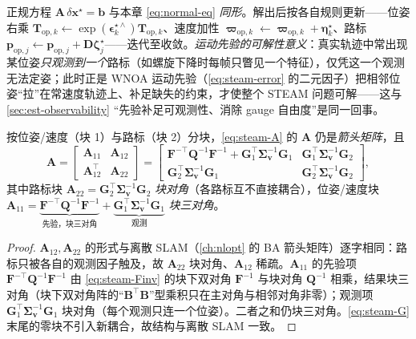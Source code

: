 正规方程 $\mathbf{A}\,\delta\mathbf{x}^\star=\mathbf{b}$ 与本章 \cref{eq:normal-eq} \emph{同形}。解出后按各自规则更新——位姿右乘 $\mathbf{T}_{\mathrm{op},k}\leftarrow\exp(\boldsymbol{\epsilon}_k^{\star\wedge})\mathbf{T}_{\mathrm{op},k}$、速度加性 $\boldsymbol{\varpi}_{\mathrm{op},k}\leftarrow\boldsymbol{\varpi}_{\mathrm{op},k}+\boldsymbol{\eta}_k^\star$、路标 $\mathbf{p}_{\mathrm{op},j}\leftarrow\mathbf{p}_{\mathrm{op},j}+\mathbf{D}\boldsymbol{\zeta}_j^\star$——迭代至收敛。\emph{运动先验的可解性意义}：真实轨迹中常出现某位姿\emph{只观测到一个}路标（如螺旋下降时每帧只瞥见一个特征），仅凭这一个观测无法定姿；此时正是 WNOA 运动先验（\cref{eq:steam-error} 的二元因子）把相邻位姿“拉”在常速度轨迹上、补足缺失的约束，才使整个 STEAM 问题可解——这与 \cref{sec:est-observability} “先验补足可观测性、消除 gauge 自由度”是同一回事。

\begin{proposition}\label{prop:steam-sparse}
按位姿/速度（块 1）与路标（块 2）分块，\cref{eq:steam-A} 的 $\mathbf{A}$ 仍是\emph{箭头矩阵}，且
\begin{equation}
  \mathbf{A}=\begin{bmatrix}\mathbf{A}_{11}&\mathbf{A}_{12}\\\mathbf{A}_{12}^\top&\mathbf{A}_{22}\end{bmatrix}
  =\begin{bmatrix}\mathbf{F}^{-\top}\mathbf{Q}^{-1}\mathbf{F}^{-1}+\mathbf{G}_1^\top\boldsymbol{\Sigma}_{\mathbf{v}}^{-1}\mathbf{G}_1&\mathbf{G}_1^\top\boldsymbol{\Sigma}_{\mathbf{v}}^{-1}\mathbf{G}_2\\\mathbf{G}_2^\top\boldsymbol{\Sigma}_{\mathbf{v}}^{-1}\mathbf{G}_1&\mathbf{G}_2^\top\boldsymbol{\Sigma}_{\mathbf{v}}^{-1}\mathbf{G}_2\end{bmatrix},
  \label{eq:steam-arrow}
\end{equation}
其中路标块 $\mathbf{A}_{22}=\mathbf{G}_2^\top\boldsymbol{\Sigma}_{\mathbf{v}}^{-1}\mathbf{G}_2$ \emph{块对角}（各路标互不直接耦合），位姿/速度块 $\mathbf{A}_{11}=\underbrace{\mathbf{F}^{-\top}\mathbf{Q}^{-1}\mathbf{F}^{-1}}_{\text{先验，块三对角}}+\underbrace{\mathbf{G}_1^\top\boldsymbol{\Sigma}_{\mathbf{v}}^{-1}\mathbf{G}_1}_{\text{观测}}$ \emph{块三对角}。
\end{proposition}
\begin{proof}
$\mathbf{A}_{12},\mathbf{A}_{22}$ 的形式与离散 SLAM（\cref{ch:nlopt} 的 BA 箭头矩阵）逐字相同：路标只被各自的观测因子触及，故 $\mathbf{A}_{22}$ 块对角、$\mathbf{A}_{12}$ 稀疏。$\mathbf{A}_{11}$ 的先验项 $\mathbf{F}^{-\top}\mathbf{Q}^{-1}\mathbf{F}^{-1}$ 由 \cref{eq:steam-Finv} 的块下双对角 $\mathbf{F}^{-1}$ 与块对角 $\mathbf{Q}^{-1}$ 相乘，结果块三对角（块下双对角阵的“$\mathbf{B}^\top\mathbf{B}$”型乘积只在主对角与相邻对角非零）；观测项 $\mathbf{G}_1^\top\boldsymbol{\Sigma}_{\mathbf{v}}^{-1}\mathbf{G}_1$ 块对角（每个观测只连一个位姿）。二者之和仍块三对角。\cref{eq:steam-G} 末尾的零块不引入新耦合，故结构与离散 SLAM 一致。
\end{proof}

